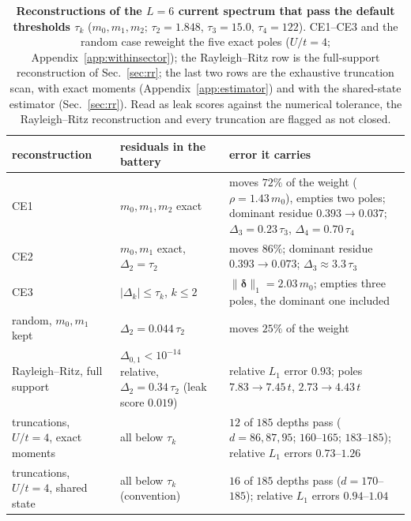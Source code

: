 \documentclass[submission, PhysCore]{SciPost}
\begin{document}
\begin{table}[t]
\caption{\label{tab:counter}\textbf{Reconstructions of the $L=6$ current spectrum that pass the default thresholds $\tau_k$} ($m_0,m_1,m_2$; $\tau_2=1.848$, $\tau_3=15.0$, $\tau_4=122$). CE1--CE3 and the random case reweight the five exact poles ($U/t=4$; Appendix~\ref{app:withinsector}); the Rayleigh--Ritz row is the full-support reconstruction of Sec.~\ref{sec:rr}; the last two rows are the exhaustive truncation scan, with exact moments (Appendix~\ref{app:estimator}) and with the shared-state estimator (Sec.~\ref{sec:rr}). Read as leak scores against the numerical tolerance, the Rayleigh--Ritz reconstruction and every truncation are flagged as not closed.}
\small
\begin{tabular}{p{}p{}p{}}
\toprule
reconstruction & residuals in the battery & error it carries \tabularnewline
\midrule
\raggedright CE1 & \raggedright $m_0,m_1,m_2$ exact & \raggedright moves $72\%$ of the weight ($\rho=1.43\,m_0$), empties two poles; dominant residue $0.393\to0.037$; $\Delta_3=0.23\,\tau_3$, $\Delta_4=0.70\,\tau_4$ \tabularnewline\addlinespace[2pt]
\raggedright CE2 & \raggedright $m_0,m_1$ exact, $\Delta_2=\tau_2$ & \raggedright moves $86\%$; dominant residue $0.393\to0.073$; $\Delta_3\approx3.3\,\tau_3$ \tabularnewline\addlinespace[2pt]
\raggedright CE3 & \raggedright $|\Delta_k|\le\tau_k$, $k\le2$ & \raggedright $\|\bm\delta\|_1=2.03\,m_0$; empties three poles, the dominant one included \tabularnewline\addlinespace[2pt]
\raggedright random, $m_0,m_1$ kept & \raggedright $\Delta_2=0.044\,\tau_2$ & \raggedright moves $25\%$ of the weight \tabularnewline\addlinespace[2pt]
\raggedright Rayleigh--Ritz, full support & \raggedright $\Delta_{0,1}<10^{-14}$ relative, $\Delta_2=0.34\,\tau_2$ (leak score $0.019$) & \raggedright relative $L_1$ error $0.93$; poles $7.83\to7.45\,t$, $2.73\to4.43\,t$ \tabularnewline\addlinespace[2pt]
\raggedright truncations, $U/t=4$, exact moments & \raggedright all below $\tau_k$ & \raggedright $12$ of $185$ depths pass ($d=86,87,95$; $160$--$165$; $183$--$185$); relative $L_1$ errors $0.73$--$1.26$ \tabularnewline\addlinespace[2pt]
\raggedright truncations, $U/t=4$, shared state & \raggedright all below $\tau_k$ (convention) & \raggedright $16$ of $185$ depths pass ($d=170$--$185$); relative $L_1$ errors $0.94$--$1.04$ \tabularnewline
\bottomrule
\end{tabular}
\end{table}
\end{document}

